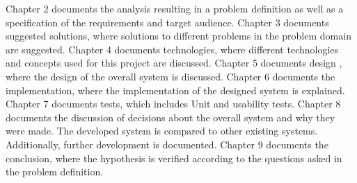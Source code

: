 Chapter 2 documents the analysis resulting in a problem definition as well as a specification of the requirements and target audience.
Chapter 3 documents suggested solutions, where solutions to different problems in the problem domain are suggested.
Chapter 4 documents technologies, where different technologies and concepts used for this project are discussed.
Chapter 5 documents design , where the design of the overall system is discussed.
Chapter 6 documents the implementation, where the implementation of the designed system is explained.
Chapter 7 documents tests, which includes Unit and usability tests. 
Chapter 8 documents the discussion of decisions about the overall system and why they were made. The developed system is compared to other existing systems. Additionally, further development is documented.
Chapter 9 documents the conclusion, where the hypothesis is verified according to the questions asked in the problem definition.
